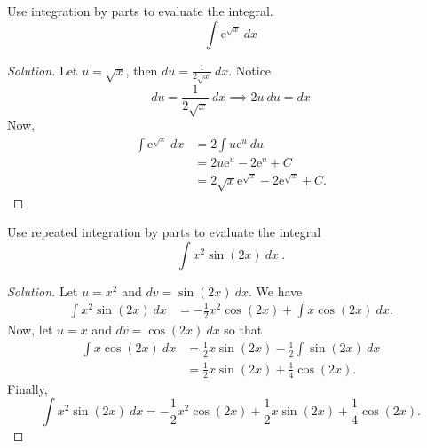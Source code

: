 \documentclass[compacto,10pt,comentarios]{aleph-notas}
\begin{document}
\begin{ejer}
    Use integration by parts to evaluate the integral.
    $$
        \int \mathrm{e}^{\sqrt{x}} ~ dx
    $$
\end{ejer}
\begin{proof}[Solution]
    Let $u = \sqrt{x}$, then $du = \frac{1}{2\sqrt{x}}~dx$. Notice
    $$
    du = \frac{1}{2\sqrt{x}}~dx \implies 2u~du = dx
    $$
    Now,
    \begin{align*}
        \int \mathrm{e}^{\sqrt{x}} ~ dx
            & = 2 \int u \mathrm{e}^{u} ~ du \\
            & = 2 u\mathrm{e}^{u} - 2 \mathrm{e}^{u} + C \\
            & = 2 \sqrt{x}\mathrm{e}^{\sqrt{x}} - 2 \mathrm{e}^{\sqrt{x}} + C .
    \end{align*}
\end{proof}



\begin{ejer}
    Use repeated integration by parts to evaluate the integral
    $$
        \int x^{2} \sin(2x) ~ dx ~ .
    $$
\end{ejer}
\begin{proof}[Solution]
    Let $u = x^{2}$ and $dv = \sin(2x)~dx$. We have
    \begin{align*}
        \int x^{2} \sin(2x) ~ dx
        & = -\frac{1}{2}x^{2}\cos(2x) + \int x \cos(2x)~dx .
    \end{align*}
    Now, let $ \hat{u} = x$ and $d\hat{v} = \cos(2x)~dx$ so that
    \begin{align*}
        \int x \cos(2x)~dx 
            & = \frac{1}{2}x\sin(2x) - \frac{1}{2} \int \sin(2x)~dx \\
            & = \frac{1}{2}x\sin(2x) + \frac{1}{4} \cos(2x) .
    \end{align*}
    Finally,
    $$
    \int x^{2} \sin(2x) ~ dx 
    = -\frac{1}{2}x^{2}\cos(2x) + \frac{1}{2}x\sin(2x) + \frac{1}{4} \cos(2x).
    $$
\end{proof}
\end{document}
